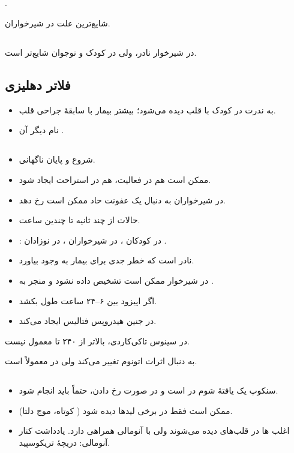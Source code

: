 \documentclass[12pt,a4paper]{article}
\begin{document}
\subsection*{}
.

شایع‌ترین علت  در شیرخواران.
\subsection*{}
در شیرخوار نادر، ولی در کودک و نوجوان شایع‌تر است.
\subsection*{فلاتر دهلیزی}
\begin{itemize}
\item به ندرت در کودک با قلب  دیده می‌شود؛ بیشتر بیمار با سابقهٔ جراحی قلب.
\item نام دیگر آن .
\end{itemize}
\subsection*{}
\begin{itemize}
\item شروع و پایان ناگهانی.
\item ممکن است هم در فعالیت، هم در استراحت ایجاد شود.
\item در شیرخواران به دنبال یک عفونت حاد ممکن است رخ دهد.
\item حالات از چند ثانیه تا چندین ساعت.
\item {}: در کودکان ، در شیرخواران ، در نوزادان .
\item نادر است که خطر جدی برای بیمار به وجود بیاورد.
\item در شیرخوار ممکن است تشخیص داده نشود و منجر به .
\item اگر اپیزود بین ۶–۲۴ ساعت طول بکشد.
\item در جنین هیدروپس فتالیس ایجاد می‌کند.
\end{itemize}
در سینوس تاکی‌کاردی،  بالاتر از ۲۴۰ تا  معمول نیست.

 به دنبال اثرات اتونوم تغییر می‌کند ولی در  معمولاً  است.

\subsection*{}
\begin{itemize}
\item سنکوپ یک یافتهٔ شوم در  است و در صورت رخ دادن، حتماً  باید انجام شود.
\item {} ممکن است فقط در برخی لیدها دیده شود ( کوتاه، موج دلتا).

\item اغلب ها در قلب‌های  دیده می‌شوند ولی با آنومالی  همراهی دارد. یادداشت کنار آنومالی: دریچهٔ تریکوسپید.
\end{itemize}
\end{document}
